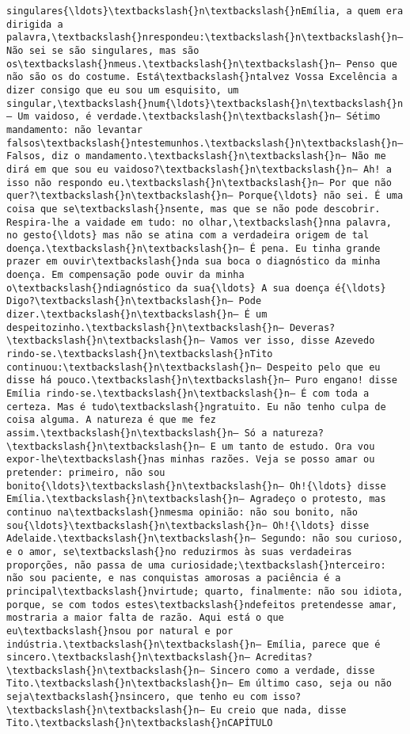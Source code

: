 \begin{Verbatim}[commandchars=\\\{\}]
singulares{\ldots}\textbackslash{}n\textbackslash{}nEmília, a quem era dirigida a palavra,\textbackslash{}nrespondeu:\textbackslash{}n\textbackslash{}n— Não sei se são singulares, mas são os\textbackslash{}nmeus.\textbackslash{}n\textbackslash{}n— Penso que não são os do costume. Está\textbackslash{}ntalvez Vossa Excelência a dizer consigo que eu sou um esquisito, um singular,\textbackslash{}num{\ldots}\textbackslash{}n\textbackslash{}n— Um vaidoso, é verdade.\textbackslash{}n\textbackslash{}n— Sétimo mandamento: não levantar falsos\textbackslash{}ntestemunhos.\textbackslash{}n\textbackslash{}n— Falsos, diz o mandamento.\textbackslash{}n\textbackslash{}n— Não me dirá em que sou eu vaidoso?\textbackslash{}n\textbackslash{}n— Ah! a isso não respondo eu.\textbackslash{}n\textbackslash{}n— Por que não quer?\textbackslash{}n\textbackslash{}n— Porque{\ldots} não sei. É uma coisa que se\textbackslash{}nsente, mas que se não pode descobrir. Respira-lhe a vaidade em tudo: no olhar,\textbackslash{}nna palavra, no gesto{\ldots} mas não se atina com a verdadeira origem de tal doença.\textbackslash{}n\textbackslash{}n— É pena. Eu tinha grande prazer em ouvir\textbackslash{}nda sua boca o diagnóstico da minha doença. Em compensação pode ouvir da minha o\textbackslash{}ndiagnóstico da sua{\ldots} A sua doença é{\ldots} Digo?\textbackslash{}n\textbackslash{}n— Pode dizer.\textbackslash{}n\textbackslash{}n— É um despeitozinho.\textbackslash{}n\textbackslash{}n— Deveras?\textbackslash{}n\textbackslash{}n— Vamos ver isso, disse Azevedo rindo-se.\textbackslash{}n\textbackslash{}nTito continuou:\textbackslash{}n\textbackslash{}n— Despeito pelo que eu disse há pouco.\textbackslash{}n\textbackslash{}n— Puro engano! disse Emília rindo-se.\textbackslash{}n\textbackslash{}n— É com toda a certeza. Mas é tudo\textbackslash{}ngratuito. Eu não tenho culpa de coisa alguma. A natureza é que me fez assim.\textbackslash{}n\textbackslash{}n— Só a natureza?\textbackslash{}n\textbackslash{}n— E um tanto de estudo. Ora vou expor-lhe\textbackslash{}nas minhas razões. Veja se posso amar ou pretender: primeiro, não sou bonito{\ldots}\textbackslash{}n\textbackslash{}n— Oh!{\ldots} disse Emília.\textbackslash{}n\textbackslash{}n— Agradeço o protesto, mas continuo na\textbackslash{}nmesma opinião: não sou bonito, não sou{\ldots}\textbackslash{}n\textbackslash{}n— Oh!{\ldots} disse Adelaide.\textbackslash{}n\textbackslash{}n— Segundo: não sou curioso, e o amor, se\textbackslash{}no reduzirmos às suas verdadeiras proporções, não passa de uma curiosidade;\textbackslash{}nterceiro: não sou paciente, e nas conquistas amorosas a paciência é a principal\textbackslash{}nvirtude; quarto, finalmente: não sou idiota, porque, se com todos estes\textbackslash{}ndefeitos pretendesse amar, mostraria a maior falta de razão. Aqui está o que eu\textbackslash{}nsou por natural e por indústria.\textbackslash{}n\textbackslash{}n— Emília, parece que é sincero.\textbackslash{}n\textbackslash{}n— Acreditas?\textbackslash{}n\textbackslash{}n— Sincero como a verdade, disse Tito.\textbackslash{}n\textbackslash{}n— Em último caso, seja ou não seja\textbackslash{}nsincero, que tenho eu com isso?\textbackslash{}n\textbackslash{}n— Eu creio que nada, disse Tito.\textbackslash{}n\textbackslash{}nCAPÍTULO 
\end{Verbatim}
